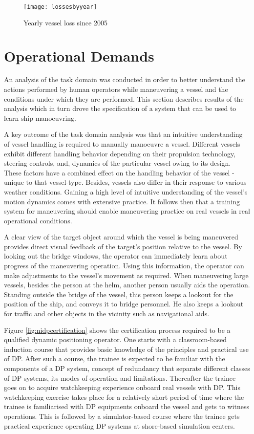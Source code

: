 \begin{figure}
	\centering
	\texttt{[image: lossesbyyear]}
	\caption{Yearly vessel loss since 2005}
	\label{fig:lossesbyyear}
\end{figure}

\section{Operational Demands}
\label{sec:operationaldemands}
An analysis of the task domain was conducted in order to better understand the actions performed by human operators while maneuvering a vessel and the conditions under which they are performed. This section describes results of the analysis which in turn drove the specification of a system that can be used to learn ship manoeuvring.

A key outcome of the task domain analysis was that an intuitive understanding of vessel handling is required to manually manoeuvre a vessel. Different vessels exhibit different handling behavior depending on their propulsion technology, steering controls, and, dynamics of the particular vessel owing to its design. These factors have a combined effect on the handling behavior of the vessel - unique to that vessel-type. Besides, vessels also differ in their response to various weather conditions. Gaining a high level of intuitive understanding of the vessel’s motion dynamics comes with extensive practice. It follows then that a training system for maneuvering should enable maneuvering practice on real vessels in real operational conditions.

A clear view of the target object around which the vessel is being maneuvered provides direct visual feedback of the target’s position relative to the vessel. By looking out the bridge windows, the operator can immediately learn about progress of the maneuvering operation. Using this information, the operator can make adjustments to the vessel's movement as required. When maneuvering large vessels, besides the person at the helm, another person usually aids the operation. Standing outside the bridge of the vessel, this person keeps a lookout for the position of the ship, and conveys it to bridge personnel. He also keeps a lookout for traffic and other objects in the vicinity such as navigational aids.

Figure \ref{fig:nidpcertification} shows the certification process required to be a qualified dynamic positioning operator. One starts with a classroom-based induction course that provides basic knowledge of the principles and practical use of DP. After such a course, the trainee is expected to be familiar with the components of a DP system, concept of redundancy that separate different classes of DP systems, its modes of operation and limitations. Thereafter the trainee goes on to acquire watchkeeping experience onboard real vessels with DP. This watchkeeping exercise takes place for a relatively short period of time where the trainee is familiarised with DP equipments onboard the vessel and gets to witness operations. This is followed by a simulator-based course where the trainee gets practical experience operating DP systems at shore-based simulation centers. 

